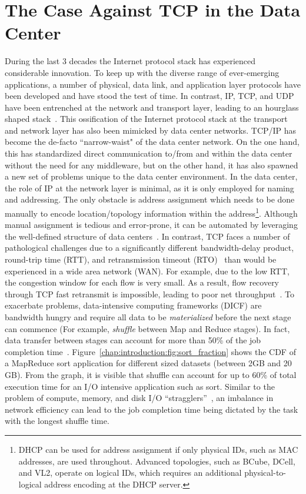 \documentclass[a4paper,12pt,twoside,openright]{report}
\begin{document}
\section{The Case Against TCP in the Data Center}
During the last 3 decades the Internet protocol stack has experienced
considerable innovation. To keep up with the diverse range of ever-emerging
applications, a number of physical, data link, and application layer protocols
have been developed and have stood the test of time. In contrast, IP, TCP, and
UDP have been entrenched at the network and transport layer, leading to an
hourglass shaped stack~\cite{Akhshabi:2011:ELP}. This ossification of the
Internet protocol stack at the transport and network layer has also been
mimicked by data center networks. TCP/IP has become the de-facto ``narrow-waist"
of the data center network. On the one hand, this has standardized direct
communication to/from and within the data center without the need for any
middleware, but on the other hand, it has also spawned a new set of problems
unique to the data center environment. In the data center, the role of IP at the
network layer is minimal, as it is only employed for naming and addressing. The
only obstacle is address assignment which needs to be done manually to encode
location/topology information within the address\footnote{DHCP can be used for
address assignment if only physical IDs, such as MAC addresses, are used
throughout. Advanced topologies, such as BCube, DCell, and VL2, operate on
logical IDs, which requires an additional physical-to-logical address encoding
at the DHCP server.}. Although manual assignment is tedious and error-prone, it
can be automated by leveraging the well-defined structure of data
centers~\cite{Chen:2010:GAA}. In contrast, TCP faces a number of pathological
challenges due to a significantly different bandwidth-delay product, round-trip
time (RTT), and retransmission timeout (RTO)~\cite{Chen:2009:UTI} than would be
experienced in a wide area network (WAN). For example, due to the low RTT, the
congestion window for each flow is very small. As a result, flow recovery
through TCP fast retransmit is impossible, leading to poor net
throughput~\cite{Kandula:2009:NDC}. To exacerbate problems, data-intensive
computing frameworks (DICF) are bandwidth hungry and require all data to be
\emph{materialized} before the next stage can commence (For example,
\emph{shuffle} between Map and Reduce stages). In fact, data transfer between
stages can account for more than 50\% of the job completion
time~\cite{Chowdhury:2011:MDT}.
Figure~\ref{chap:introduction:fig:sort_fraction} shows the CDF of a MapReduce
sort application for different sized datasets (between 2GB and 20 GB). From the
graph, it is visible that shuffle can account for up to 60\% of total execution
time for an I/O intensive application such as sort. Similar to the problem of
compute, memory, and disk I/O ``stragglers''~\cite{Zaharia:2008:IMP}, an
imbalance in network efficiency can lead to the job completion time being
dictated by the task with the longest shuffle time.
\end{document}
